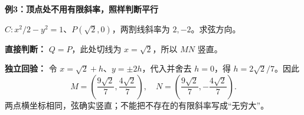 \clearpage
\begin{examplebox}
\textbf{例3：顶点处不用有限斜率，照样判断平行}

$C:x^2/2-y^2=1$、$P(\sqrt2,0)$，两割线斜率为 $2,-2$。求弦方向。

\begin{center}

\end{center}

\textbf{直接判断：} $Q=P$，此处切线为 $x=\sqrt2$，所以 $MN$ 竖直。

\textbf{独立回验：} 令 $x=\sqrt2+h$、$y=\pm2h$，代入并舍去 $h=0$，得 $h=2\sqrt2/7$。因此
\[
M=\left(\frac{9\sqrt2}{7},\frac{4\sqrt2}{7}\right),\quad
N=\left(\frac{9\sqrt2}{7},-\frac{4\sqrt2}{7}\right).
\]
两点横坐标相同，弦确实竖直；不能把不存在的有限斜率写成“无穷大”。
\end{examplebox}
